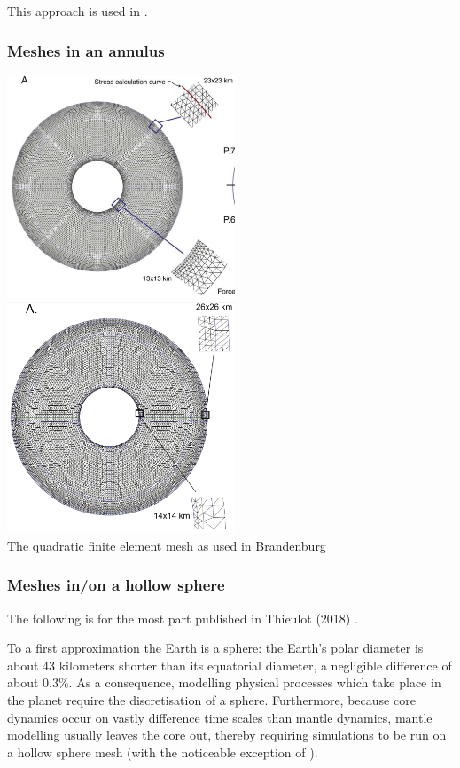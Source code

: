 This approach is used in .

\subsubsection{Meshes in an annulus}


\begin{center}
\includegraphics[width=6.8cm]{images/meshes/brhv08}
\includegraphics[width=6.8cm]{images/meshes/brva07a}\\
{\captionfont The quadratic finite element mesh as used in 
Brandenburg \etal \cite{brhv08,brva07a}}
\end{center}


\subsubsection{Meshes in/on a hollow sphere}

The following is for the most part published in Thieulot (2018) \cite{thie18}.

To a first approximation the Earth is a sphere: the Earth's polar diameter is 
about 43 kilometers shorter than its equatorial diameter, a negligible difference of 
about 0.3\%. As a consequence, modelling physical processes 
which take place in the planet require the discretisation of a sphere. 
Furthermore, because core dynamics occur on vastly difference time scales than mantle dynamics, mantle 
modelling usually leaves the core out, thereby requiring simulations to be run on a hollow sphere mesh
(with the noticeable exception of \cite{geyu07}).

